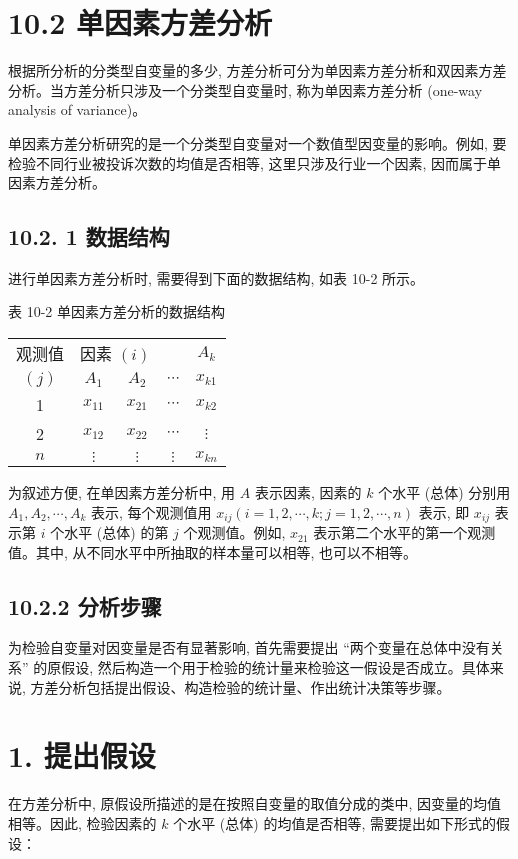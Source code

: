\documentclass[10pt]{article}
\begin{document}
\begin{CJK*}{UTF8}{bsmi}
\section*{10.2 单因素方差分析}
根据所分析的分类型自变量的多少, 方差分析可分为单因素方差分析和双因素方差分析。当方差分析只涉及一个分类型自变量时, 称为单因素方差分析 (one-way analysis of variance)。

单因素方差分析研究的是一个分类型自变量对一个数值型因变量的影响。例如, 要检验不同行业被投诉次数的均值是否相等, 这里只涉及行业一个因素, 因而属于单因素方差分析。

\subsection*{10.2. 1 数据结构}
进行单因素方差分析时, 需要得到下面的数据结构, 如表 10-2 所示。

表 10-2 单因素方差分析的数据结构

\begin{center}
\begin{tabular}{ccccc}
\hline
观测值 & \multicolumn{2}{c}{因素 $(i)$} &  & $A_{k}$ \\
\cline { 2 - 5 }
$(j)$ & $A_{1}$ & $A_{2}$ & $\cdots$ & $x_{k 1}$ \\
1 & $x_{11}$ & $x_{21}$ & $\cdots$ & $x_{k 2}$ \\
2 & $x_{12}$ & $x_{22}$ & $\cdots$ & $\vdots$ \\
$n$ & $\vdots$ & $\vdots$ & $\vdots$ & $x_{k n}$ \\
\hline
\end{tabular}
\end{center}

为叙述方便, 在单因素方差分析中, 用 $A$ 表示因素, 因素的 $k$ 个水平 (总体) 分别用 $A_{1}, A_{2}, \cdots, A_{k}$ 表示, 每个观测值用 $x_{i j}(i=1,2, \cdots, k ; j=1,2, \cdots, n)$ 表示, 即 $x_{i j}$ 表示第 $i$ 个水平 (总体) 的第 $j$ 个观测值。例如, $x_{21}$ 表示第二个水平的第一个观测值。其中, 从不同水平中所抽取的样本量可以相等, 也可以不相等。

\subsection*{10.2.2 分析步骤}
为检验自变量对因变量是否有显著影响, 首先需要提出 “两个变量在总体中没有关系” 的原假设, 然后构造一个用于检验的统计量来检验这一假设是否成立。具体来说, 方差分析包括提出假设、构造检验的统计量、作出统计决策等步骤。

\section*{1. 提出假设}
在方差分析中, 原假设所描述的是在按照自变量的取值分成的类中, 因变量的均值相等。因此, 检验因素的 $k$ 个水平 (总体) 的均值是否相等, 需要提出如下形式的假设：


\end{CJK*}
\end{document}
